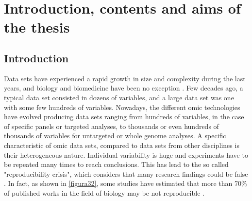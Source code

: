 
\chapter[Introduction, contents and aims of the thesis]{Introduction, contents and aims of the thesis}



\section{Introduction}
\label{sec:Intro}
Data sets have experienced a rapid growth in size and complexity during the last years, and biology and biomedicine have been no exception \parencite{marx2013biology}. Few decades ago, a typical data set consisted in dozens of variables, and a large data set was one with some few hundreds of variables. Nowadays, the different omic technologies have evolved producing data sets ranging from hundreds of variables, in the case of specific panels or targeted analyses, to thousands or even hundreds of thousands of variables for untargeted or whole genome analyses. A specific characteristic of omic data sets, compared to data sets from other disciplines is their heterogeneous nature. Individual variability is huge and experiments have to be repeated many times to reach conclusions. This has lead to the so called "reproducibility crisis", which considers that many research findings could be false \parencite{ioannidis2005most, begley2015reproducibility}. In fact, as shown in \autoref{figura32}, some studies have estimated that more than 70\% of published works in the field of biology may be not reproducible \parencite{baker20161}.
